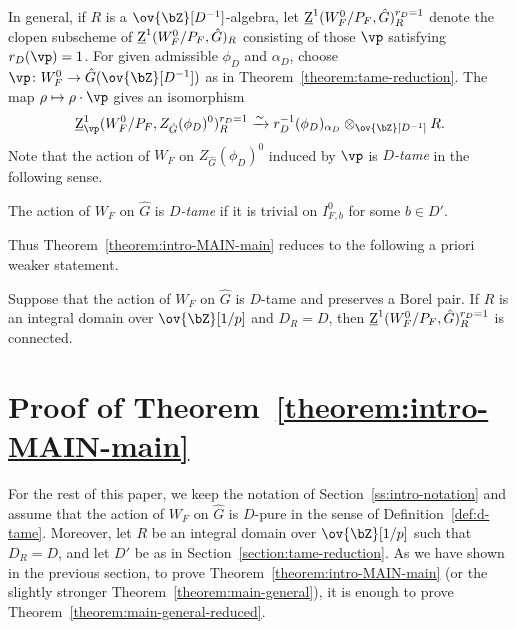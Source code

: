 In general, if $R$ is a $\ov{\bZ}[D^{-1}]$-algebra, let $\underline{\rm{Z}}^1(W_F^0/P_F, \hat{G})_R^{r_D = 1}$ denote the clopen subscheme of $\underline{\rm{Z}}^1(W_F^0/P_F, \hat{G})_R$ consisting of those $\vp$ satisfying $r_D(\vp) = 1$. For given admissible $\phi_D$ and $\alpha_D$, choose $\vp\colon W_F^0 \to \hat{G}(\ov{\bZ}[D^{-1}])$ as in Theorem~\ref{theorem:tame-reduction}. The map $\rho \mapsto \rho \cdot \vp$ gives an isomorphism
\[
\underline{\rm{Z}}^1_{\vp}(W_F^0/P_F, Z_{\hat{G}}(\phi_D)^0)_R^{r_D = 1} \xrightarrow[]{\sim} r_D^{-1}(\phi_D)_{\alpha_D} \otimes_{\ov{\bZ}[D^{-1}]} R.
\]
Note that the action of $W_F$ on $Z_{\hat{G}}(\phi_D)^0$ induced by $\vp$ is \textit{$D$-tame} in the following sense.

\begin{definition}\label{def:d-tame}
    The action of $W_F$ on $\hat{G}$ is \textit{$D$-tame} if it is trivial on $I_{F, b}^0$ for some $b \in D'$.
\end{definition}

Thus Theorem~\ref{theorem:intro-MAIN-main} reduces to the following a priori weaker statement.

\begin{theorem}\label{theorem:main-general-reduced}
    Suppose that the action of $W_F$ on $\hat{G}$ is $D$-tame and preserves a Borel pair. If $R$ is an integral domain over $\ov{\bZ}[1/p]$ and $D_R = D$, then $\underline{\rm{Z}}^1(W_F^0/P_F, \hat{G})^{r_D = 1}_R$ is connected.
\end{theorem}





























\section{Proof of Theorem~\ref{theorem:intro-MAIN-main}}\label{section:proof}

For the rest of this paper, we keep the notation of Section~\ref{ss:intro-notation} and assume that the action of $W_F$ on $\hat{G}$ is $D$-pure in the sense of Definition~\ref{def:d-tame}. Moreover, let $R$ be an integral domain over $\ov{\bZ}[1/p]$ such that $D_R = D$, and let $D'$ be as in Section~\ref{section:tame-reduction}. As we have shown in the previous section, to prove Theorem~\ref{theorem:intro-MAIN-main} (or the slightly stronger Theorem~\ref{theorem:main-general}), it is enough to prove Theorem~\ref{theorem:main-general-reduced}.



